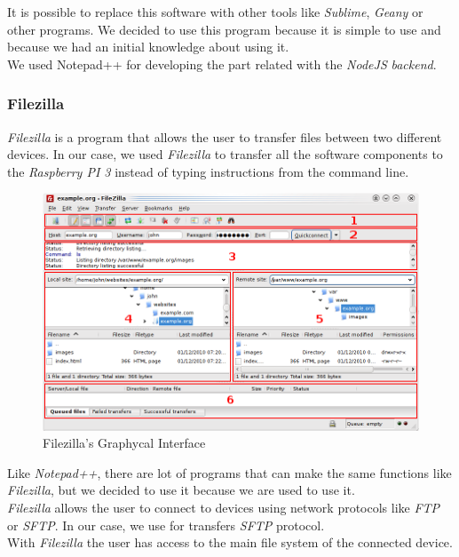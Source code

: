 It is possible to replace this software with other tools like \textit{Sublime}, \textit{Geany} or other programs. We decided to use this program because it is simple to use and because we had an initial knowledge about using it.\\

We used Notepad++ for developing the part related with the \textit{NodeJS} \textit{backend}.

\subsubsection{Filezilla}

\textit{Filezilla} is a program that allows the user to transfer files between two different devices. In our case, we used \textit{Filezilla} to transfer all the software components to the \textit{Raspberry PI 3} instead of typing instructions from the command line.\\

\begin{figure}[H]
\begin{centering}
\includegraphics[scale=0.9]{IMGS/FILEZILLA.png}
\caption{Filezilla's Graphycal Interface \label{FILEZILLA}}
\end{centering}
\end{figure}

Like \textit{Notepad++}, there are lot of programs that can make the same functions like \textit{Filezilla}, but we decided to use it because we are used to use it.\\

\textit{Filezilla} allows the user to connect to devices using network protocols like \textit{FTP} or \textit{SFTP}. In our case, we use for transfers \textit{SFTP} protocol.\\

With \textit{Filezilla} the user has access to the main file system of the connected device.

